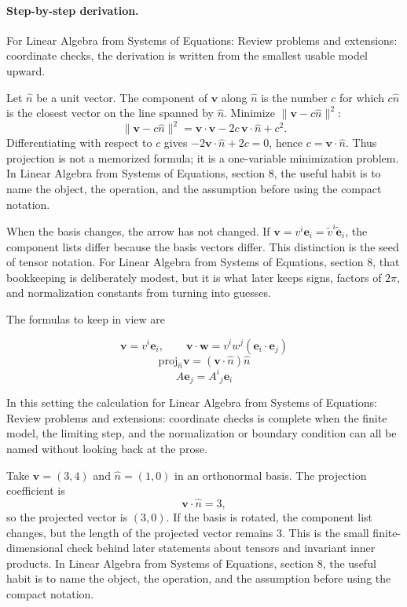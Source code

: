 \paragraph{Step-by-step derivation.}

For Linear Algebra from Systems of Equations: Review problems and extensions: coordinate checks, the derivation is written from the smallest usable model upward.

Let \(\hat n\) be a unit vector.  The component of \(\bm v\) along \(\hat n\) is the number \(c\) for which \(c\hat n\) is the closest vector on the line spanned by \(\hat n\).  Minimize \(\|\bm v-c\hat n\|^2\):
\[
  \|\bm v-c\hat n\|^2=\bm v\cdot\bm v-2c\,\bm v\cdot\hat n+c^2.
\]
Differentiating with respect to \(c\) gives \(-2\bm v\cdot\hat n+2c=0\), hence \(c=\bm v\cdot\hat n\).  Thus projection is not a memorized formula; it is a one-variable minimization problem.  In Linear Algebra from Systems of Equations, section 8, the useful habit is to name the object, the operation, and the assumption before using the compact notation.

When the basis changes, the arrow has not changed.  If \(\bm v=v^i\bm e_i=\tilde v^i\tilde{\bm e}_i\), the component lists differ because the basis vectors differ.  This distinction is the seed of tensor notation.  For Linear Algebra from Systems of Equations, section 8, that bookkeeping is deliberately modest, but it is what later keeps signs, factors of \(2\pi\), and normalization constants from turning into guesses.

The formulas to keep in view are

\[
  \bm v=v^i\bm e_i,\qquad \bm v\cdot\bm w=v^iw^j(\bm e_i\cdot\bm e_j)
\]
\[
  \mathrm{proj}_{\hat n}\bm v=(\bm v\cdot\hat n)\hat n
\]
\[
  A\bm e_j=A^i{}_j\bm e_i
\]

In this setting the calculation for Linear Algebra from Systems of Equations: Review problems and extensions: coordinate checks is complete when the finite model, the limiting step, and the normalization or boundary condition can all be named without looking back at the prose.




\begin{example}
Take \(\bm v=(3,4)\) and \(\hat n=(1,0)\) in an orthonormal basis.  The projection coefficient is
\[
  \bm v\cdot\hat n=3,
\]
so the projected vector is \((3,0)\).  If the basis is rotated, the component list changes, but the length of the projected vector remains \(3\).  This is the small finite-dimensional check behind later statements about tensors and invariant inner products.  In Linear Algebra from Systems of Equations, section 8, the useful habit is to name the object, the operation, and the assumption before using the compact notation.
\end{example}



